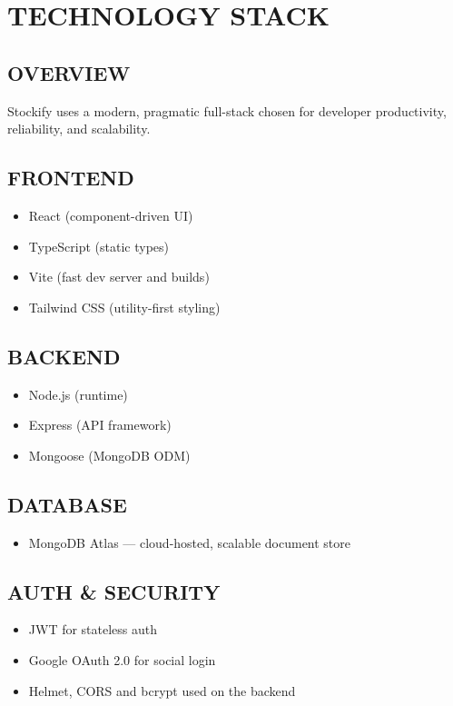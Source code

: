 
\chapter{TECHNOLOGY STACK}

\section{OVERVIEW}

Stockify uses a modern, pragmatic full-stack chosen for developer productivity, reliability, and scalability.

\section{FRONTEND}

\begin{itemize}
\item React (component-driven UI)
\item TypeScript (static types)
\item Vite (fast dev server and builds)
\item Tailwind CSS (utility-first styling)
\end{itemize}

\section{BACKEND}

\begin{itemize}
\item Node.js (runtime)
\item Express (API framework)
\item Mongoose (MongoDB ODM)
\end{itemize}

\section{DATABASE}

\begin{itemize}
\item MongoDB Atlas — cloud-hosted, scalable document store
\end{itemize}

\section{AUTH \& SECURITY}

\begin{itemize}
\item JWT for stateless auth
\item Google OAuth 2.0 for social login
\item Helmet, CORS and bcrypt used on the backend
\end{itemize}

